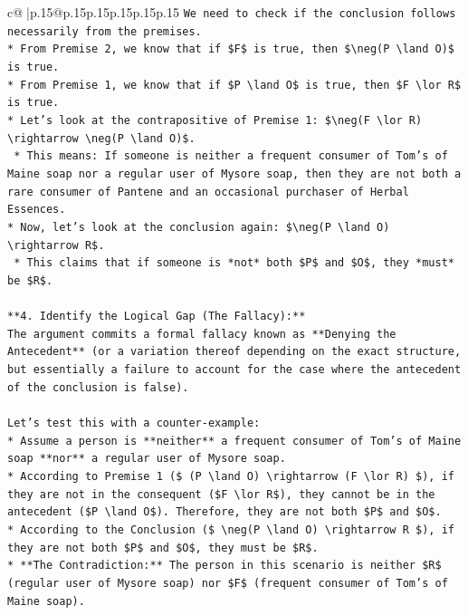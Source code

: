 \documentclass{article}
\begin{document}
{\begin{supertabular}{c@{$\;$}|p{.15\linewidth}@{}p{.15\linewidth}p{.15\linewidth}p{.15\linewidth}p{.15\linewidth}p{.15\linewidth}}
{{{\texttt{We need to check if the conclusion follows necessarily from the premises.} \\
\texttt{*   From Premise 2, we know that if \$F\$ is true, then \$\textbackslash{}neg(P \textbackslash{}land O)\$ is true.} \\
\texttt{*   From Premise 1, we know that if \$P \textbackslash{}land O\$ is true, then \$F \textbackslash{}lor R\$ is true.} \\
\texttt{*   Let's look at the contrapositive of Premise 1: \$\textbackslash{}neg(F \textbackslash{}lor R) \textbackslash{}rightarrow \textbackslash{}neg(P \textbackslash{}land O)\$.} \\
\texttt{    *   This means: If someone is neither a frequent consumer of Tom's of Maine soap nor a regular user of Mysore soap, then they are not both a rare consumer of Pantene and an occasional purchaser of Herbal Essences.} \\
\texttt{*   Now, let's look at the conclusion again: \$\textbackslash{}neg(P \textbackslash{}land O) \textbackslash{}rightarrow R\$.} \\
\texttt{    *   This claims that if someone is *not* both \$P\$ and \$O\$, they *must* be \$R\$.} \\
\\ 
\texttt{**4. Identify the Logical Gap (The Fallacy):**} \\
\texttt{The argument commits a formal fallacy known as **Denying the Antecedent** (or a variation thereof depending on the exact structure, but essentially a failure to account for the case where the antecedent of the conclusion is false).} \\
\\ 
\texttt{Let's test this with a counter{-}example:} \\
\texttt{*   Assume a person is **neither** a frequent consumer of Tom's of Maine soap **nor** a regular user of Mysore soap.} \\
\texttt{*   According to Premise 1 (\$ (P \textbackslash{}land O) \textbackslash{}rightarrow (F \textbackslash{}lor R) \$), if they are not in the consequent (\$F \textbackslash{}lor R\$), they cannot be in the antecedent (\$P \textbackslash{}land O\$). Therefore, they are not both \$P\$ and \$O\$.} \\
\texttt{*   According to the Conclusion (\$ \textbackslash{}neg(P \textbackslash{}land O) \textbackslash{}rightarrow R \$), if they are not both \$P\$ and \$O\$, they must be \$R\$.} \\
\texttt{*   **The Contradiction:** The person in this scenario is neither \$R\$ (regular user of Mysore soap) nor \$F\$ (frequent consumer of Tom's of Maine soap).} \\
}}}
\end{supertabular}}
\end{document}
